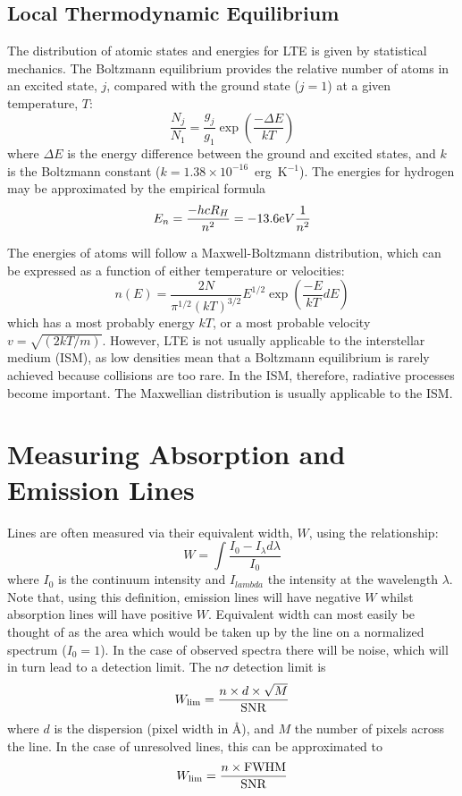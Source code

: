 \subsection{Local Thermodynamic Equilibrium}

The distribution of atomic states and energies for LTE is given by statistical mechanics. The Boltzmann equilibrium provides the relative number of atoms in an excited state, $j$, compared with the ground state ($j=1$) at a given temperature, $T$:
\begin{equation}
	\frac{N_j}{N_1} = \frac{g_j}{g_1} \exp\left(\frac{-\Delta E}{kT}\right)
\end{equation}
where $\Delta E$ is the energy difference between the ground and excited states, and $k$ is the Boltzmann constant ($k = 1.38 \times 10^{-16}$~erg~K$^{-1}$). The energies for hydrogen may be approximated by the empirical formula
\begin{equation}
	E_n = \frac{-h c R_H}{n^2} = -13.6{\textrm eV}\frac{1}{n^2}
\end{equation}

The energies of atoms will follow a Maxwell-Boltzmann distribution, which can be expressed as a function of either temperature or velocities:
\begin{equation}
	n(E) = \frac{2 N}{\pi^{1/2} (kT)^{3/2}} E^{1/2} \exp\left(\frac{-E}{kT} dE\right)
\end{equation}
which has a most probably energy $kT$, or a most probable velocity $v = \sqrt{(2kT/m)}$. However, LTE is not usually applicable to the interstellar medium (ISM), as low densities mean that a Boltzmann equilibrium is rarely achieved because collisions are too rare. In the ISM, therefore, radiative processes become important. The Maxwellian distribution is usually applicable to the ISM.

\section{Measuring Absorption and Emission Lines}

Lines are often measured via their equivalent width, $W$, using the relationship:
\begin{equation}
	W = \int{\frac{I_0 - I_{\lambda} d\lambda}{I_0}}
\end{equation}
where $I_0$ is the continuum intensity and $I_{lambda}$ the intensity at the wavelength $\lambda$. Note that, using this definition, emission lines will have negative $W$ whilst absorption lines will have positive $W$. Equivalent width can most easily be thought of as the area which would be taken up by the line on a normalized spectrum ($I_0 = 1$). In the case of observed spectra there will be noise, which will in turn lead to a detection limit. The n$\sigma$ detection limit is
\begin{equation}
	W_{\rm lim} = \frac{n \times d \times \sqrt{M}}{\rm SNR}
\end{equation}
where $d$ is the dispersion (pixel width in \AA), and $M$ the number of pixels across the line. In the case of unresolved lines, this can be approximated to
\begin{equation}
	W_{\rm lim} = \frac{n \times {\rm FWHM}}{\rm SNR}
\end{equation}

